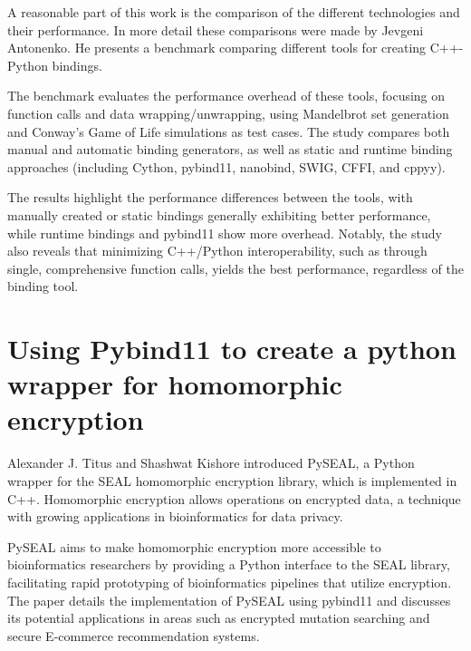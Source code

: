 A reasonable part of this work is the comparison of the different technologies and their performance. In more detail these comparisons were made by Jevgeni Antonenko. He presents a benchmark comparing different tools for creating C++-Python bindings. 

The benchmark evaluates the performance overhead of these tools, focusing on function calls and data wrapping/unwrapping, using Mandelbrot set generation and Conway's Game of Life simulations as test cases. The study compares both manual and automatic binding generators, as well as static and runtime binding approaches (including Cython, pybind11, nanobind, SWIG, CFFI, and cppyy). 

The results highlight the performance differences between the tools, with manually created or static bindings generally exhibiting better performance, while runtime bindings and pybind11 show more overhead. Notably, the study also reveals that minimizing C++/Python interoperability, such as through single, comprehensive function calls, yields the best performance, regardless of the binding tool. \cite{rw-benchmarks}

\section{Using Pybind11 to create a python wrapper for homomorphic encryption}

Alexander J. Titus and Shashwat Kishore introduced PySEAL, a Python wrapper for the SEAL homomorphic encryption library, which is implemented in C++. Homomorphic encryption allows operations on encrypted data, a technique with growing applications in bioinformatics for data privacy. 

PySEAL aims to make homomorphic encryption more accessible to bioinformatics researchers by providing a Python interface to the SEAL library, facilitating rapid prototyping of bioinformatics pipelines that utilize encryption. The paper details the implementation of PySEAL using pybind11 and discusses its potential applications in areas such as encrypted mutation searching and secure E-commerce recommendation systems. \cite{rw-pyseal}
